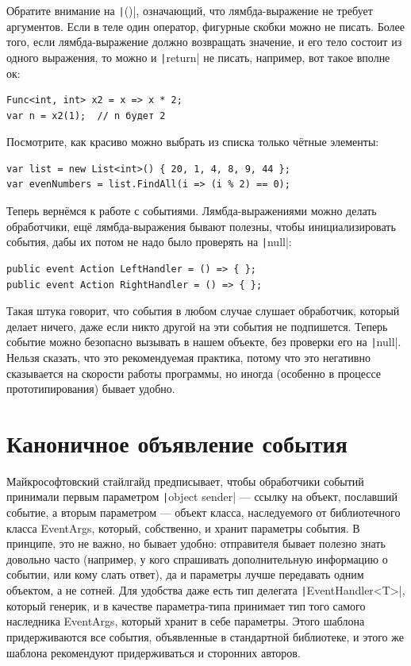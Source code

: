 \documentclass{../../text-style}
\begin{document}
Обратите внимание на \texttt|()|, означающий, что лямбда-выражение не требует аргументов. Если в теле один оператор, фигурные скобки можно не писать. Более того, если лямбда-выражение должно возвращать значение, и его тело состоит из одного выражения, то можно и \texttt|return| не писать, например, вот такое вполне ок:

\begin{verbatim}
Func<int, int> x2 = x => x * 2;
var n = x2(1);  // n будет 2
\end{verbatim}

Посмотрите, как красиво можно выбрать из списка только чётные элементы:

\begin{verbatim}
var list = new List<int>() { 20, 1, 4, 8, 9, 44 };
var evenNumbers = list.FindAll(i => (i % 2) == 0);
\end{verbatim}

Теперь вернёмся к работе с событиями. Лямбда-выражениями можно делать обработчики, ещё лямбда-выражения бывают полезны, чтобы инициализировать события, дабы их потом не надо было проверять на \texttt|null|:

\begin{verbatim}
public event Action LeftHandler = () => { };
public event Action RightHandler = () => { };
\end{verbatim}

Такая штука говорит, что события в любом случае слушает обработчик, который делает ничего, даже если никто другой на эти события не подпишется. Теперь событие можно безопасно вызывать в нашем объекте, без проверки его на \texttt|null|. Нельзя сказать, что это рекомендуемая практика, потому что это негативно сказывается на скорости работы программы, но иногда (особенно в процессе прототипирования) бывает удобно.

\section{Каноничное объявление события}

Майкрософтовский стайлгайд предписывает, чтобы обработчики событий принимали первым параметром \texttt|object sender| --- ссылку на объект, пославший событие, а вторым параметром --- объект класса, наследуемого от библиотечного класса EventArgs, который, собственно, и хранит параметры события. В принципе, это не важно, но бывает удобно: отправителя бывает полезно знать довольно часто (например, у кого спрашивать дополнительную информацию о событии, или кому слать ответ), да и параметры лучше передавать одним объектом, а не сотней. Для удобства даже есть тип делегата \texttt|EventHandler<T>|, который генерик, и в качестве параметра-типа принимает тип того самого наследника EventArgs, который хранит в себе параметры. Этого шаблона придерживаются все события, объявленные в стандартной библиотеке, и этого же шаблона рекомендуют придерживаться и сторонних авторов.
\end{document}
